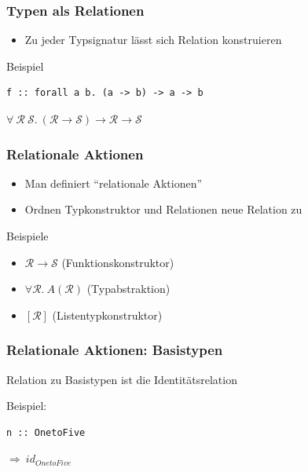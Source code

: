 \documentclass{beamer}
\begin{document}

\begin{frame}[fragile]
\frametitle{Typen als Relationen}

\begin{itemize}
\item Zu jeder Typsignatur lässt sich Relation konstruieren
\end{itemize}

\pause
\vspace{36px}
Beispiel

\begin{verbatim}
f :: forall a b. (a -> b) -> a -> b
\end{verbatim}

\pause

$\forall ~\mathcal{R} ~\mathcal{S}.~ (\mathcal{R} \rightarrow \mathcal{S}) \rightarrow \mathcal{R} \rightarrow \mathcal{S}$
\end{frame}


\begin{frame}
\frametitle{Relationale Aktionen}

\begin{itemize}
\item Man definiert ``relationale Aktionen''
\item Ordnen Typkonstruktor und Relationen neue Relation zu
\end{itemize}

\pause
\vspace{36px}
Beispiele

\begin{itemize}[<+->]
\item $\mathcal{R} \rightarrow \mathcal{S}$ (Funktionskonstruktor)
\item $\forall \mathcal{R}.~ A(\mathcal{R})$ (Typabstraktion)
\item $[\mathcal{R}]$ (Listentypkonstruktor)
\end{itemize}

\end{frame}



\begin{frame}[fragile]
\frametitle{Relationale Aktionen: Basistypen}

Relation zu Basistypen ist die Identitätsrelation

\pause
\vspace{36px}
Beispiel:

\begin{verbatim}
n :: OnetoFive
\end{verbatim}

\pause

$\Rightarrow~id_{OnetoFive}$

\end{frame}
\end{document}
